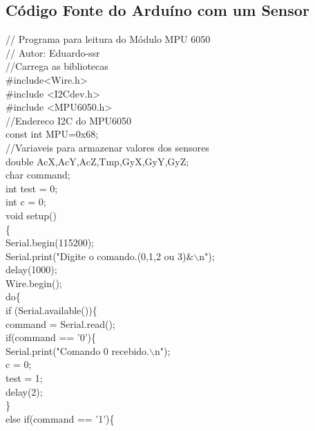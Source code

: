 \begin{apendicesenv}

\partapendices

\chapter{Código Fonte do Arduíno com um Sensor}
\label{apA}
// Programa para leitura do Módulo MPU 6050 \\
// Autor: Eduardo-ssr\\

//Carrega as bibliotecas\\
\#include<Wire.h>\\
\#include <I2Cdev.h>\\
\#include <MPU6050.h>\\

//Endereco I2C do MPU6050\\
const int MPU=0x68;  \\

//Variaveis para armazenar valores dos sensores\\
double AcX,AcY,AcZ,Tmp,GyX,GyY,GyZ;\\
char command;\\
int test = 0;\\
int c = 0;\\

void setup()\\
\{\\
Serial.begin(115200);\\
Serial.print("Digite o comando.(0,1,2 ou 3)\&$\backslash$n");\\
delay(1000);\\
Wire.begin();\\
do\{\\
if (Serial.available())\{\\

command = Serial.read();\\

if(command == '0')\{\\  
Serial.print("Comando 0 recebido.$\backslash$n");\\
c = 0;\\
test = 1;\\
delay(2);\\	
\}\\	
else if(command == '1')\{\\


\end{apendicesenv}
